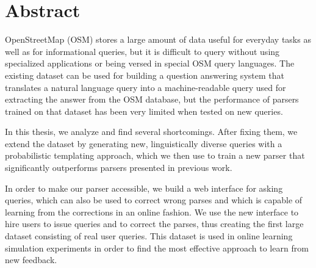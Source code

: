 \chapter{Abstract}
\label{ch:abstract-english}

OpenStreetMap (OSM) stores a large amount of data useful for everyday tasks as
well as for informational queries, but it is difficult to query without using
specialized applications or being versed in special OSM query languages. The
existing \nlmapstwo{} dataset can be used for building a question answering
system that translates a natural language query into a machine-readable query
used for extracting the answer from the OSM database, but the performance of
parsers trained on that dataset has been very limited when tested on new
queries.

In this thesis, we analyze \nlmapstwo{} and find several shortcomings. After
fixing them, we extend the dataset by generating new, linguistically diverse
queries with a probabilistic templating approach, which we then use to train a
new parser that significantly outperforms parsers presented in previous work.

In order to make our parser accessible, we build a web interface for asking
queries, which can also be used to correct wrong parses and which is capable of
learning from the corrections in an online fashion. We use the new interface to
hire users to issue queries and to correct the parses, thus creating the first
large \nlmaps{} dataset consisting of real user queries. This dataset is used in
online learning simulation experiments in order to find the most effective
approach to learn from new feedback.

